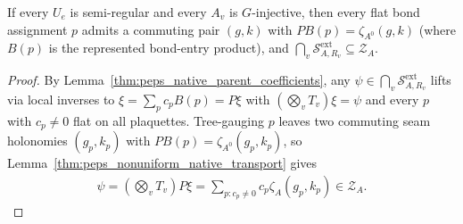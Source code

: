 \begin{lemma}%
    \label{thm:peps_nonuniform_native_spanning}
    \leanok
    If every $U_e$ is semi-regular and every $A_v$ is $G$-injective, then
    every flat bond assignment $p$ admits a commuting pair $(g,k)$ with
    $PB(p)=\zeta_{A^0}(g,k)$ (where $B(p)$ is the represented bond-entry
    product), and $\bigcap_v\mathcal S_{A,R_v}^{\mathrm{ext}}\subseteq\mathcal Z_A$.
\end{lemma}
\begin{proof}\leanok
    By Lemma~\ref{thm:peps_native_parent_coefficients}, any
    $\psi\in\bigcap_v\mathcal S_{A,R_v}^{\mathrm{ext}}$ lifts via local inverses
    to $\xi=\sum_pc_pB(p)=P\xi$ with $(\bigotimes_vT_v)\xi=\psi$ and every $p$
    with $c_p\ne0$ flat on all plaquettes. Tree-gauging $p$ leaves two
    commuting seam holonomies $(g_p,k_p)$ with $PB(p)=\zeta_{A^0}(g_p,k_p)$, so
    Lemma~\ref{thm:peps_nonuniform_native_transport} gives
    \begin{align}
        \psi=(\bigotimes_vT_v)P\xi
        =\sum_{p:c_p\ne0}c_p\zeta_A(g_p,k_p)\in\mathcal Z_A.
        \label{eq:peps_nonuniform_native_span}
    \end{align}
\end{proof}

